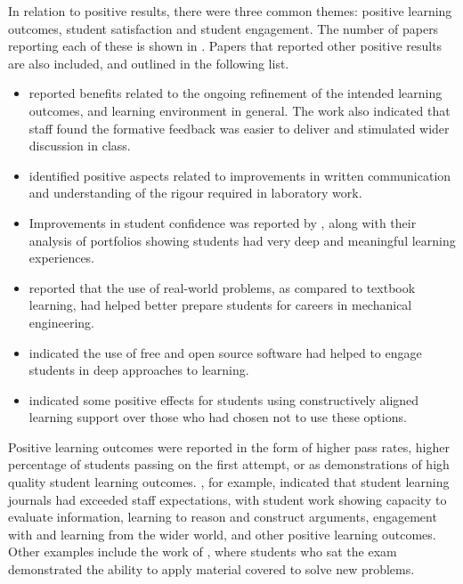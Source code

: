 In relation to positive results, there were three common themes: positive learning outcomes, student satisfaction and student engagement. The number of papers reporting each of these is shown in . Papers that reported other positive results are also included, and outlined in the following list.

\begin{itemize}[noitemsep,nolistsep]
	\item \citet{Hill:2009} reported benefits related to the ongoing refinement of the intended learning outcomes, and learning environment in general. The work also indicated that staff found the formative feedback was easier to deliver and stimulated wider discussion in class.
	\item \citet{Morton:2008} identified positive aspects related to improvements in written communication and understanding of the rigour required in laboratory work.
	\item Improvements in student confidence was reported by \citet{scott2009promoting}, along with their analysis of portfolios showing students had very deep and meaningful learning experiences.
	\item \citet{Schaefer:2009} reported that the use of real-world problems, as compared to textbook learning, had helped better prepare students for careers in mechanical engineering.
	\item \citet{Vanfretti:2011} indicated the use of free and open source software had helped to engage students in deep approaches to learning.
	\item \citet{Vogel:2007} indicated some positive effects for students using constructively aligned learning support over those who had chosen not to use these options. 
\end{itemize}

Positive learning outcomes were reported in the form of higher pass rates, higher percentage of students passing on the first attempt, or as demonstrations of high quality student learning outcomes. \citet{Szili:2011}, for example, indicated that student learning journals had exceeded staff expectations, with student work showing capacity to evaluate information, learning to reason and construct arguments, engagement with and learning from the wider world, and other positive learning outcomes. Other examples include the work of \citet{warren2005teaching}, where students who sat the exam demonstrated the ability to apply material covered to solve new problems.

